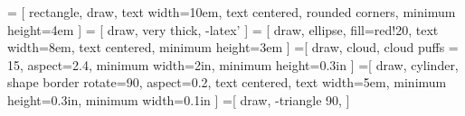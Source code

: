  = [
  rectangle, 
  draw, 
  text width=10em, 
  text centered, 
  rounded corners, 
  minimum height=4em
]
 = [
  draw, 
  very thick, 
  -latex'
]
 = [
  draw, 
  ellipse,
  fill=red!20, 
  text width=8em, 
  text centered,  
  minimum height=3em
]
=[
  draw,
  cloud,
  cloud puffs = 15,
  aspect=2.4,
  minimum width=2in,
  minimum height=0.3in
]
=[
  draw,
  cylinder,
  shape border rotate=90,
  aspect=0.2,
  text centered,
  text width=5em,
  minimum height=0.3in,
  minimum width=0.1in
]
=[
  draw,
  -triangle 90,
]

